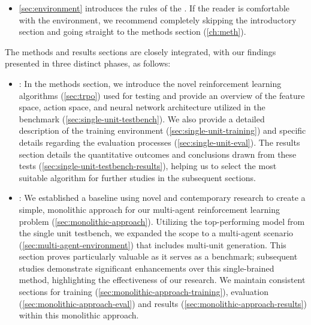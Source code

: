 \begin{itemize}[itemsep=4pt, parsep=0pt]
\item \autoref{sec:environment} introduces the rules of the . If the reader is comfortable with the environment, we recommend completely skipping the introductory section and going straight to the methods section (\autoref{ch:meth}).

\end{itemize}

\noindent The methods and results sections are closely integrated, with our findings presented in three distinct phases, as follows:

\begin{itemize}[itemsep=4pt, parsep=0pt]

\item {}: In the methods section, we introduce the novel reinforcement learning algorithms (\autoref{sec:trpo}) used for testing and provide an overview of the feature space, action space, and neural network architecture utilized in the benchmark (\autoref{sec:single-unit-testbench}). We also provide a detailed description of the training environment (\autoref{sec:single-unit-training}) and specific details regarding the evaluation processes (\autoref{sec:single-unit-eval}). The results section details the quantitative outcomes and conclusions drawn from these tests (\autoref{sec:single-unit-testbench-results}), helping us to select the most suitable algorithm for further studies in the subsequent sections.

\item {}: We established a baseline using novel and contemporary research to create a simple, monolithic approach for our multi-agent reinforcement learning problem (\autoref{sec:monolithic-approach}). Utilizing the top-performing model from the single unit testbench, we expanded the scope to a multi-agent scenario (\autoref{sec:multi-agent-environment}) that includes multi-unit generation. This section proves particularly valuable as it serves as a benchmark; subsequent studies demonstrate significant enhancements over this single-brained method, highlighting the effectiveness of our research. We maintain consistent sections for training (\autoref{sec:monolithic-approach-training}), evaluation (\autoref{sec:monolithic-approach-eval}) and results (\autoref{sec:monolithic-approach-results}) within this monolithic approach.


\end{itemize}
